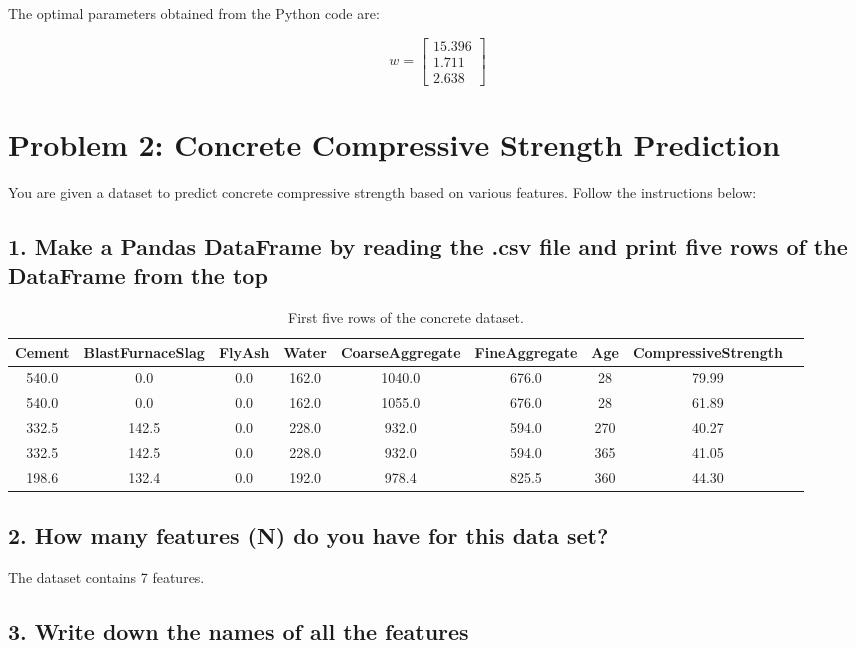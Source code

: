 \documentclass[a4paper,10pt]{article}
\begin{document}
The optimal parameters obtained from the Python code are:

\[
w = \begin{bmatrix}
15.396 \\
1.711 \\
2.638
\end{bmatrix}
\]

\newpage
\section*{Problem 2: Concrete Compressive Strength Prediction}

You are given a dataset to predict concrete compressive strength based on various features. Follow the instructions below:

\subsection*{1. Make a Pandas DataFrame by reading the .csv file and print five rows of the DataFrame from the top}

\begin{table}[h!]
\centering
\begin{tabular}{|c|c|c|c|c|c|c|c|c|}
\hline
Cement & BlastFurnaceSlag & FlyAsh & Water & CoarseAggregate & FineAggregate & Age & CompressiveStrength \\
\hline
540.0 & 0.0 & 0.0 & 162.0 & 1040.0 & 676.0 & 28 & 79.99 \\
540.0 & 0.0 & 0.0 & 162.0 & 1055.0 & 676.0 & 28 & 61.89 \\
332.5 & 142.5 & 0.0 & 228.0 & 932.0 & 594.0 & 270 & 40.27 \\
332.5 & 142.5 & 0.0 & 228.0 & 932.0 & 594.0 & 365 & 41.05 \\
198.6 & 132.4 & 0.0 & 192.0 & 978.4 & 825.5 & 360 & 44.30 \\
\hline
\end{tabular}
\caption{First five rows of the concrete dataset.}
\end{table}
\subsection*{2. How many features (N) do you have for this data set?}

The dataset contains 7 features.

\subsection*{3. Write down the names of all the features}
\end{document}
